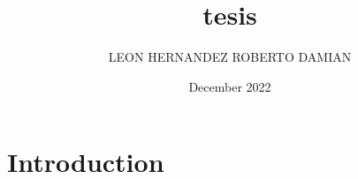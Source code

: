\documentclass{article}
\title{tesis}
\author{LEON HERNANDEZ ROBERTO DAMIAN}
\date{December 2022}
\begin{document}
\maketitle

\section{Introduction}
\end{document}
